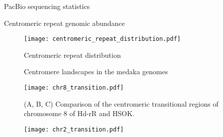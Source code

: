 \begin{table}[htbp]
  \centering
  \caption{PacBio sequencing statistics}
  
  \label{sequencing_stats}
\end{table}

\begin{table}[htbp]
  \centering
  \caption{Centromeric repeat genomic abundance}
  
  \label{centromeric_repeat_genomic_abundance}
\end{table}

\begin{figure}[p]
  \centering
  \texttt{[image: centromeric\_repeat\_distribution.pdf]}
  \caption{
    Centromeric repeat distribution
  }
  \label{genome_browser}
\end{figure}

\begin{figure}[p]
  \centering
  \caption{
    Centromere landscapes in the medaka genomes
  }
  \label{centromere_landscape}
\end{figure}

\begin{figure}[p]
  \centering
  \texttt{[image: chr8\_transition.pdf]}
  \caption{
    (A, B, C) Comparison of the centromeric transitional regions of chromosome 8 of Hd-rR and HSOK.
  }
  \label{other_chroms_transition}
\end{figure}

\addtocounter{figure}{-1}
\begin{figure}[p]
  \centering
  \texttt{[image: chr2\_transition.pdf]}
\end{figure}
